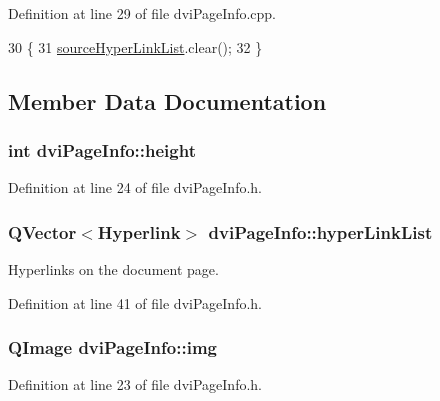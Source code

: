 Definition at line 29 of file dvi\+Page\+Info.\+cpp.


\begin{DoxyCode}
30 \{
31     \hyperlink{classdviPageInfo_ae3d8b5ce976b2df5c29244577362bb4f}{sourceHyperLinkList}.clear();
32 \}
\end{DoxyCode}


\subsection{Member Data Documentation}
\hypertarget{classdviPageInfo_af6aae8bcca7fab26e073f0cda75197ad}{
\subsubsection[{height}]{\setlength{\rightskip}{0pt plus 5cm}int dvi\+Page\+Info\+::height}}\label{classdviPageInfo_af6aae8bcca7fab26e073f0cda75197ad}


Definition at line 24 of file dvi\+Page\+Info.\+h.

\hypertarget{classdviPageInfo_a1e95c1ee9212ccad20661ed1c141e84e}{
\subsubsection[{hyper\+Link\+List}]{\setlength{\rightskip}{0pt plus 5cm}Q\+Vector$<${\bf Hyperlink}$>$ dvi\+Page\+Info\+::hyper\+Link\+List}}\label{classdviPageInfo_a1e95c1ee9212ccad20661ed1c141e84e}


Hyperlinks on the document page. 



Definition at line 41 of file dvi\+Page\+Info.\+h.

\hypertarget{classdviPageInfo_a2e14764bd0da8f668fdae66527e35db6}{
\subsubsection[{img}]{\setlength{\rightskip}{0pt plus 5cm}Q\+Image dvi\+Page\+Info\+::img}}\label{classdviPageInfo_a2e14764bd0da8f668fdae66527e35db6}


Definition at line 23 of file dvi\+Page\+Info.\+h.

